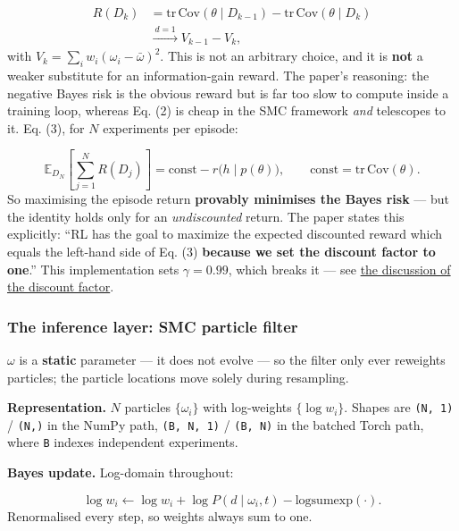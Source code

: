 \documentclass[12pt,a4paper]{article}
\begin{document}
\begin{align}
R(D_k) &= \mathrm{tr}\,\mathrm{Cov}(\theta \mid D_{k-1}) - \mathrm{tr}\,\mathrm{Cov}(\theta \mid D_k) \nonumber \\
       &\xrightarrow{\ d=1\ } V_{k-1} - V_k,
\label{eq:reward}
\end{align}
with $V_k = \sum_i w_i(\omega_i - \bar\omega)^2$. This is not an arbitrary choice, and it is \textbf{not} a weaker substitute for an information-gain reward. The paper's reasoning: the negative Bayes risk is the obvious reward but is far too slow to compute inside a training loop, whereas Eq. (2) is cheap in the SMC framework \emph{and} telescopes to it. Eq. (3), for $N$ experiments per episode:

\begin{equation}
\mathbb{E}_{D_N}\left[\sum_{j=1}^{N} R(D_j)\right] = \mathrm{const} - r\bigl(h \mid p(\theta)\bigr),
\qquad \mathrm{const} = \mathrm{tr}\,\mathrm{Cov}(\theta).
\label{eq:telescope}
\end{equation}
So maximising the episode return \textbf{provably minimises the Bayes risk} --- but the identity holds only for an \emph{undiscounted} return. The paper states this explicitly: ``RL has the goal to maximize the expected discounted reward which equals the left-hand side of Eq. (3) \textbf{because we set the discount factor to one}.'' This implementation sets $\gamma = 0.99$, which breaks it --- see \hyperref[sec:4-gamma--099-breaks-the-bayes-risk-identity]{the discussion of the discount factor}.

\subsubsection{The inference layer: SMC particle filter}\label{sec:the-inference-layer-smc-particle-filter}
$\omega$ is a \textbf{static} parameter --- it does not evolve --- so the filter only ever reweights particles; the particle locations move solely during resampling.

\textbf{Representation.} $N$ particles $\{\omega_i\}$ with log-weights $\{\log w_i\}$. Shapes are \texttt{(N, 1)} / \texttt{(N,)} in the NumPy path, \texttt{(B, N, 1)} / \texttt{(B, N)} in the batched Torch path, where \texttt{B} indexes independent experiments.

\textbf{Bayes update.} Log-domain throughout:

\begin{equation}
\log w_i \leftarrow \log w_i + \log P(d \mid \omega_i, t) - \mathrm{logsumexp}(\cdot).
\label{eq:bayes-update}
\end{equation}
Renormalised every step, so weights always sum to one.
\end{document}

